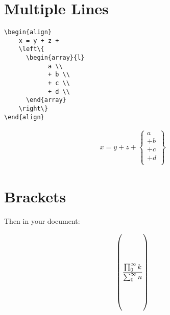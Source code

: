 \documentclass[12pt,english]{article}
\begin{document}
\pagebreak

\section{Multiple Lines}

\begin{verbatim}
\begin{align}
    x = y + z +
    \left\{
      \begin{array}{l}
            a \\
            + b \\
            + c \\
            + d \\
      \end{array}
    \right\}
\end{align}
\end{verbatim}

\begin{align}
    x = y + z +
    \left\{
      \begin{array}{l}
            a \\
            + b \\
            + c \\
            + d \\
      \end{array}
    \right\}
\end{align}

\section{Brackets}

Then in your document:

\[
\left(\rule{0cm}{2cm}
 \frac{\prod_0^\infty k}{\sum_0^\infty n}
\right)
\]
\end{document}
